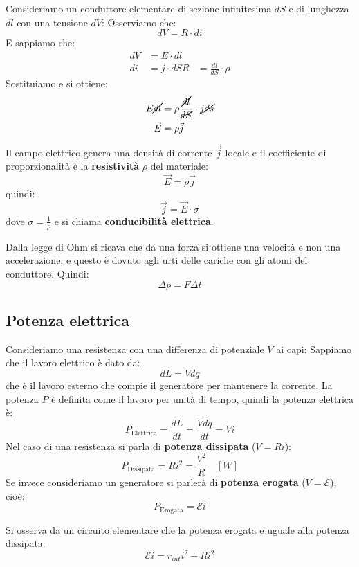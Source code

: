 \documentclass[a4paper]{article}
\begin{document}
\vspace{1em}
\noindent
Consideriamo un conduttore elementare di sezione infinitesima \( dS \) e di lunghezza
\( dl \) con una tensione \( dV \):
\label{30-04-D13}
\noindent
Osserviamo che:
\[
  dV = R \cdot di
\] 
E sappiamo che:
\[
  \begin{aligned}
    dV &= E \cdot dl \\
    di &= j \cdot dS
    R &= \frac{dl}{dS} \cdot \rho
  \end{aligned}
\] 
Sostituiamo e si ottiene:
\[
  \begin{aligned}
    E\cancel{dl} &= \rho \frac{\cancel{dl}}{\cancel{dS}} \cdot j\cancel{ds}\\
    \vec{E} &= \rho \vec{j}
  \end{aligned}
\] 
\begin{definition}
  Il campo elettrico genera una densità di corrente \( \vec{j} \) locale e il coefficiente
  di proporzionalità è la \textbf{resistività} \( \rho \) del materiale:
  \[
    \vec{E} = \rho \vec{j}
  \] 
  quindi:
  \[
    \vec{j} = \vec{E} \cdot \sigma
  \] 
  dove \( \sigma = \frac{1}{\rho} \) e si chiama \textbf{conducibilità elettrica}.
\end{definition}
Dalla legge di Ohm si ricava che da una forza si ottiene una velocità e non una accelerazione,
e questo è dovuto agli urti delle cariche con gli atomi del conduttore. Quindi:
\[
  \Delta p = F \Delta t
\] 

\subsection{Potenza elettrica}
Consideriamo una resistenza con una differenza di potenziale \( V \) ai capi:
\label{30-04-D14}
Sappiamo che il lavoro elettrico è dato da:
\[
  dL = V dq
\] 
che è il lavoro esterno che compie il generatore per mantenere la corrente.
La potenza \( P \) è definita come il lavoro per unità di tempo, quindi la potenza
elettrica è:
\[
  P_{\text{Elettrica}} = \frac{dL}{dt} = \frac{V dq}{dt} = V i
\] 
Nel caso di una resistenza si parla di \textbf{potenza dissipata} (\( V = Ri \)):
\[
  P_{\text{Dissipata}} = R i^2 = \frac{V^2}{R} \quad \left[ W \right]
\] 
Se invece consideriamo un generatore si parlerà di \textbf{potenza erogata} 
(\( V = \mathcal{E} \)), cioè:
\[
  P_{\text{Erogata}} = \mathcal{E} i
\] 

Si osserva da un circuito elementare che la potenza erogata e uguale alla potenza dissipata:
\[
  \mathcal{E}i = r_{int} i^2 + Ri^2
\] 
\end{document}
